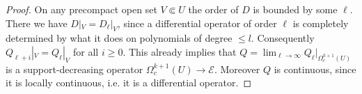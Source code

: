 \documentclass{article}
\theoremstyle{definition}
\begin{document}
\begin{proof}
On any precompact open set $V\Subset U$ the order of $D$ is bounded by some $\ell$. There we have $D|_V=D_\ell|_V$, since a differential operator of order $\ell$ is completely determined by what it does on polynomials of degree $\leq l$. Consequently $Q_{\ell+i}|_V=Q_\ell|_V$ for all $i\geq 0$. This already implies that $Q=\lim_{\ell\to \infty} Q_\ell|_{\Omega^{k+1}_c(U)}$ is a support-decreasing operator $\Omega^{k+1}_c(U)\to \mathcal E$. Moreover $Q$ is continuous, since it is locally continuous, i.e. it is a differential operator.
\end{proof}








\end{document}

